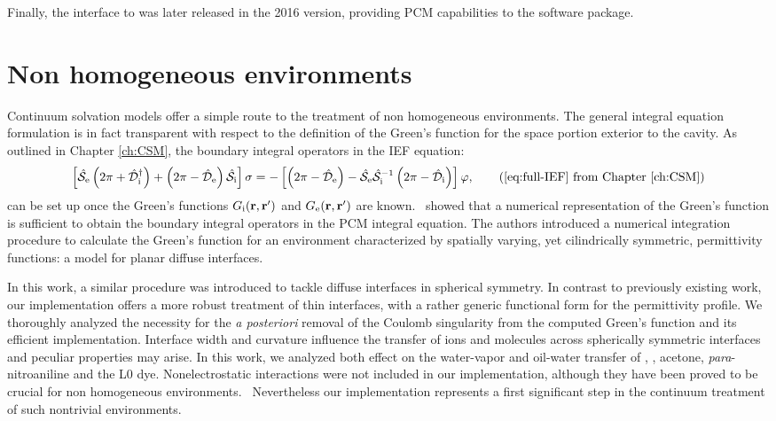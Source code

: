 Finally, the interface to \LSDALTON was later released in the 2016 version,
providing \acs{PCM} capabilities to the software package.

\section{Non homogeneous environments}\label{sec:spherical}

Continuum solvation models offer a simple route to the treatment of non
homogeneous environments.
The general integral equation formulation is in fact transparent with respect
to the definition of the Green's function for the space portion exterior to the
cavity.
As outlined in Chapter \ref{ch:CSM}, the boundary integral operators in the
\acs{IEF} equation:
\begin{equation}
  \left[ \bi{S}_\mathrm{e}\left(2\pi + \bi{D}^\dagger_\mathrm{i}\right)
  +
  \left(2\pi - \bi{D}_\mathrm{e}\right)\bi{S}_\mathrm{i}
  \right]\sigma =
  -\left[\left(2\pi-\bi{D}_\mathrm{e}\right)
  -\bi{S}_\mathrm{e}\bi{S}_\mathrm{i}^{-1}
  \left(2\pi-\bi{D}_\mathrm{i}\right)
  \right]\esp,
  \tag{\ref{eq:full-IEF} from Chapter \ref{ch:CSM}}
\end{equation}
can be set up once the Green's functions $G_\mathrm{i}(\mathbf{r}, \mathbf{r}^\prime)$ and $G_\mathrm{e}(\mathbf{r}, \mathbf{r}^\prime)$ are known.~\autocite{Cances1998-og}
\citeauthor{Frediani2004-er} showed that a numerical representation of the
Green's function is sufficient to obtain the boundary integral operators in the
\acs{PCM} integral equation.
The authors introduced a numerical integration procedure to calculate the
Green's function for an environment characterized by spatially varying, yet
cilindrically symmetric, permittivity functions: a model for planar diffuse interfaces.

In this work, a similar procedure was introduced to tackle diffuse interfaces
in spherical symmetry.
In contrast to previously existing work, our implementation offers a more robust
treatment of thin interfaces, with a rather generic functional form for the
permittivity profile.
We thoroughly analyzed the necessity for the \emph{a posteriori} removal of the
Coulomb singularity from the computed Green's function and its efficient
implementation.
Interface width and curvature influence the transfer of ions and molecules across
spherically symmetric interfaces and peculiar properties may arise.
In this work, we analyzed both effect on the water-vapor and oil-water transfer
of , , acetone, \emph{para}-nitroaniline and the L0 dye.
Nonelectrostatic interactions were not included in our implementation, although
they have been proved to be crucial for non homogeneous
environments.~\autocite{Mozgawa2014-ad}
Nevertheless our implementation represents a first significant step in the continuum treatment
of such nontrivial environments.

